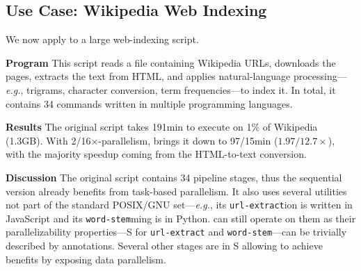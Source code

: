 \documentclass[letterpaper,twocolumn,10pt]{article}
\newcommand{\eg}{{\em e.g.}, }
\newcommand{\heading}[1]{\vspace{4pt}\noindent\textbf{#1}\enspace}
\newcommand{\ttt}[1]{\texttt{#1}}
\newcommand{\cn}[1]{\mbox{\textcircled{\footnotesize #1}}}
\newcommand{\sta}{\cn{\textsc{S}}\xspace}
\newcommand{\todo}[1]{\hl{#1}\xspace}
\newcommand{\kk}[1]{[{\color{magenta}kk: #1}]}
\begin{document}

% 
\subsection{Use Case: Wikipedia Web Indexing}
\label{macro2}

We now apply \sys to a large web-indexing script. %

\heading{Program}
This script reads a file containing Wikipedia URLs, downloads the pages,
extracts the text from HTML, and applies natural-language processing---\eg trigrams, character conversion, term frequencies---to index it.
In total, it contains 34 commands
written in multiple programming languages.

\heading{Results}
The original script takes 191min to execute on 1\% of Wikipedia (1.3GB).
With 2/16$\times$-parallelism, \sys brings it down to 97/15min ($1.97/12.7\times$), with the majority speedup coming from the HTML-to-text conversion. %


\heading{Discussion}
The original script contains 34 pipeline stages, thus the sequential version already benefits from task-based parallelism.
It also uses several utilities not part of the standard POSIX/GNU set---\eg its \ttt{url-extract}ion is written in JavaScript and its \ttt{word-stem}ming is in Python.
\sys can still operate on them as their parallelizability properties---\sta for \ttt{url-extract} and \ttt{word-stem}---can be trivially described by annotations.
Several other stages are in \sta allowing \sys to achieve benefits by exposing data parallelism.
\end{document}
